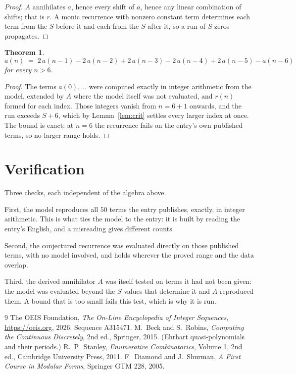 \documentclass[11pt,a4paper]{article}
\theoremstyle{plain}
\newtheorem{theorem}{Theorem}
\theoremstyle{definition}
\begin{document}
\begin{proof}
$A$ annihilates $a$, hence every shift of $a$, hence any linear combination of shifts; that is
$r$. A monic recurrence with nonzero constant term determines each term from the $S$ before it
and each from the $S$ after it, so a run of $S$ zeros propagates.
\end{proof}

\begin{theorem}
\[
a(n)\;=\;2\,a(n-1) - 2\,a(n-2) + 2\,a(n-3) - 2\,a(n-4) + 2\,a(n-5) - a(n-6)
\]
for every $n>6$.
\end{theorem}

\begin{proof}
The terms $a(0),\dots$ were computed exactly in integer arithmetic from the model, extended by
$A$ where the model itself was not evaluated, and $r(n)$ formed for each index. Those integers
vanish from $n=6+1$ onwards, and the run exceeds $S+6$, which by
Lemma~\ref{lem:crit} settles every larger index at once. The bound is exact: at $n=6$ the recurrence fails on the entry's own published terms, so no larger range holds.
\end{proof}

\section{Verification}

Three checks, each independent of the algebra above.

First, the model reproduces all $50$ terms the entry publishes, exactly, in integer
arithmetic. This is what ties the model to the entry: it is built by reading the entry's
English, and a misreading gives different counts.

Second, the conjectured recurrence was evaluated directly on those published terms, with no
model involved, and holds wherever the proved range and the data overlap.

Third, the derived annihilator $A$ was itself tested on terms it had not been given: the model
was evaluated beyond the $S$ values that determine it and $A$ reproduced them. A bound that is
too small fails this test, which is why it is run.

\begin{thebibliography}{9}
 The OEIS Foundation, \emph{The On-Line Encyclopedia of Integer
Sequences}, \url{https://oeis.org}, 2026. Sequence A315471.
 M.~Beck and S.~Robins, \emph{Computing the Continuous Discretely},
2nd ed., Springer, 2015. (Ehrhart quasi-polynomials and their periods.)
 R.~P.~Stanley, \emph{Enumerative Combinatorics}, Volume 1, 2nd ed.,
Cambridge University Press, 2011.
 F.~Diamond and J.~Shurman, \emph{A First Course in Modular Forms},
Springer GTM 228, 2005.
\end{thebibliography}
\end{document}
